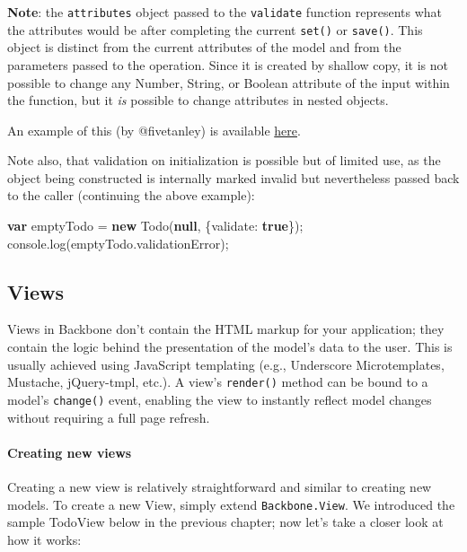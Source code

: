 \documentclass[9pt]{book}
\newenvironment{Shaded}{}{}
\newcommand{\KeywordTok}[1]{\textcolor[rgb]{0.00,0.44,0.13}{\textbf{{#1}}}}
\newcommand{\DataTypeTok}[1]{\textcolor[rgb]{0.56,0.13,0.00}{{#1}}}
\newcommand{\OtherTok}[1]{\textcolor[rgb]{0.00,0.44,0.13}{{#1}}}
\newcommand{\FunctionTok}[1]{\textcolor[rgb]{0.02,0.16,0.49}{{#1}}}
\newcommand{\NormalTok}[1]{{#1}}
\begin{document}
\textbf{Note}: the \texttt{attributes} object passed to the
\texttt{validate} function represents what the attributes would be after
completing the current \texttt{set()} or \texttt{save()}. This object is
distinct from the current attributes of the model and from the
parameters passed to the operation. Since it is created by shallow copy,
it is not possible to change any Number, String, or Boolean attribute of
the input within the function, but it \emph{is} possible to change
attributes in nested objects.

An example of this (by @fivetanley) is available
\href{http://jsfiddle.net/2NdDY/270/}{here}.

Note also, that validation on initialization is possible but of limited
use, as the object being constructed is internally marked invalid but
nevertheless passed back to the caller (continuing the above example):

\begin{Shaded}
\begin{Highlighting}[]
\KeywordTok{var} \NormalTok{emptyTodo = }\KeywordTok{new} \FunctionTok{Todo}\NormalTok{(}\KeywordTok{null}\NormalTok{, \{}\DataTypeTok{validate}\NormalTok{: }\KeywordTok{true}\NormalTok{\});}
\OtherTok{console}\NormalTok{.}\FunctionTok{log}\NormalTok{(}\OtherTok{emptyTodo}\NormalTok{.}\FunctionTok{validationError}\NormalTok{);}
\end{Highlighting}
\end{Shaded}

\subsection{Views}\label{views-1}

Views in Backbone don't contain the HTML markup for your application;
they contain the logic behind the presentation of the model's data to
the user. This is usually achieved using JavaScript templating (e.g.,
Underscore Microtemplates, Mustache, jQuery-tmpl, etc.). A view's
\texttt{render()} method can be bound to a model's \texttt{change()}
event, enabling the view to instantly reflect model changes without
requiring a full page refresh.

\paragraph{Creating new views}\label{creating-new-views}

Creating a new view is relatively straightforward and similar to
creating new models. To create a new View, simply extend
\texttt{Backbone.View}. We introduced the sample TodoView below in the
previous chapter; now let's take a closer look at how it works:
\end{document}
